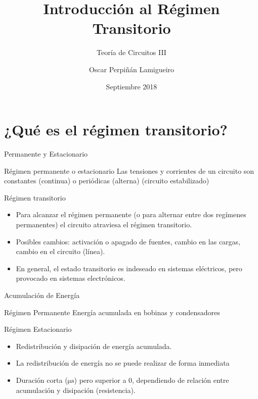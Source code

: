 \documentclass[xcolor={usenames,svgnames,dvipsnames}]{beamer}
\author{Oscar Perpiñán Lamigueiro}
\date{Septiembre 2018}
\title{Introducción al Régimen Transitorio}
\subtitle{Teoría de Circuitos III}
\begin{document}
\maketitle

\section{¿Qué es el régimen transitorio?}
\label{sec:orgeab92ea}
\begin{frame}[label={sec:org8fae7e5}]{Permanente y Estacionario}
\begin{block}{Régimen permanente o estacionario}
Las tensiones y corrientes de un circuito son constantes (continua) o periódicas (alterna) (circuito estabilizado)
\end{block}
\begin{block}{Régimen transitorio}
\begin{itemize}
\item Para alcanzar el régimen permanente (o para alternar entre dos regímenes permanentes) el circuito atraviesa el régimen transitorio.
\item Posibles cambios: activación o apagado de fuentes, cambio en las cargas, cambio en el circuito (línea).
\item En general, el estado transitorio es indeseado en sistemas eléctricos, pero provocado en sistemas electrónicos.
\end{itemize}
\end{block}
\end{frame}

\begin{frame}[label={sec:orgb7fd69d}]{Acumulación de Energía}
\begin{block}{Régimen Permanente}
\alert{Energía acumulada} en \alert{bobinas} y \alert{condensadores}
\end{block}
\begin{block}{Régimen Estacionario}
\begin{itemize}
\item \alert{Redistribución} y \alert{disipación} de energía acumulada.
\item La redistribución de energía \alert{no} se puede realizar de forma \alert{inmediata}
\item \alert{Duración corta} (\(\si{\micro\second}\)) pero superior a 0, dependiendo de \alert{relación entre acumulación y disipación} (resistencia).
\end{itemize}
\end{block}
\end{frame}
\end{document}
